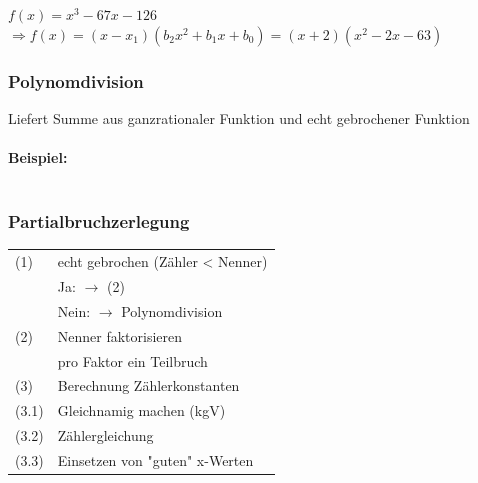 				$f(x) = x^3-67x-126$\\
				$\Rightarrow f(x) = (x-x_1)(b_2x^2 + b_1x + b_0) = (x+2)(x^2-2x-63)$ 
			
		\subsubsection{Polynomdivision}
			Liefert Summe aus ganzrationaler Funktion und echt gebrochener Funktion\\
			\\
			\textbf{Beispiel:}\\
				\vspace{-5pt}  \\
			
		\subsubsection{Partialbruchzerlegung}
			\begin{tabular}{ll}
				(1) & echt gebrochen (Zähler < Nenner) \\
				    & Ja: $\rightarrow$ (2) \\
					& Nein: $\rightarrow$ Polynomdivision \\
				(2) & Nenner faktorisieren \\
				    & pro Faktor ein Teilbruch \\
				(3) & Berechnung Zählerkonstanten \\
				(3.1) & Gleichnamig machen (kgV) \\
				(3.2) & Zählergleichung \\
				(3.3) & Einsetzen von "guten"  x-Werten \\			
			\end{tabular}
			
